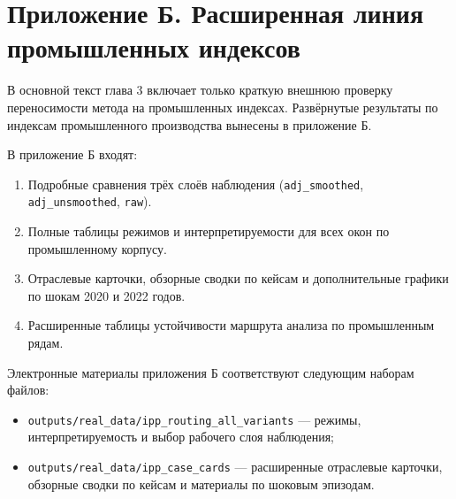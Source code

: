 \chapter{Приложение Б. Расширенная линия промышленных индексов}
\label{app:prilozhenie-b-rasshirennaya-liniya-promyshlennyh-indeksov}

В основной текст глава 3 включает только краткую внешнюю проверку переносимости метода на промышленных индексах. Развёрнутые результаты по индексам промышленного производства вынесены в приложение Б.

В приложение Б входят:

\begin{enumerate}
\def\labelenumi{\arabic{enumi}.}
\tightlist
\item
  Подробные сравнения трёх слоёв наблюдения (\texttt{adj\_smoothed}, \texttt{adj\_unsmoothed}, \texttt{raw}).
\item
  Полные таблицы режимов и интерпретируемости для всех окон по промышленному корпусу.
\item
  Отраслевые карточки, обзорные сводки по кейсам и дополнительные графики по шокам 2020 и 2022 годов.
\item
  Расширенные таблицы устойчивости маршрута анализа по промышленным рядам.
\end{enumerate}

Электронные материалы приложения Б соответствуют следующим наборам файлов:

\begin{itemize}
\tightlist
\item
  \texttt{outputs/real\_data/ipp\_routing\_all\_variants} --- режимы, интерпретируемость и выбор рабочего слоя наблюдения;
\item
  \texttt{outputs/real\_data/ipp\_case\_cards} --- расширенные отраслевые карточки, обзорные сводки по кейсам и материалы по шоковым эпизодам.
\end{itemize}
